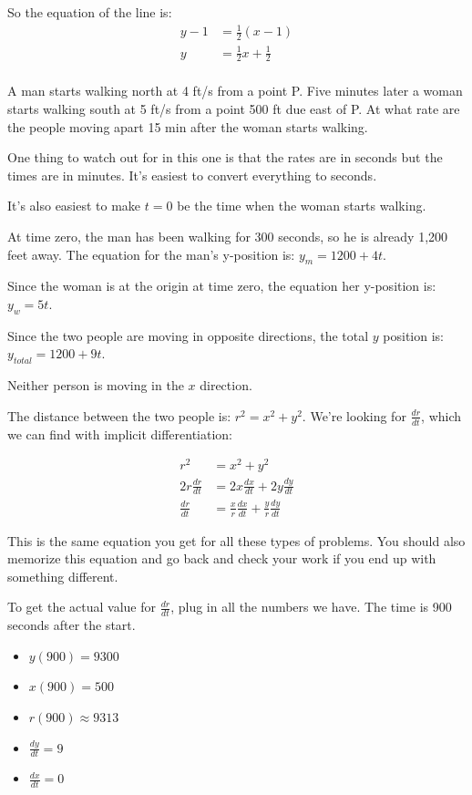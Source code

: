 \documentclass[fleqn,addpoints]{exam}
\begin{document}
\begin{questions}
\begin{solution}
So the equation of the line is: 
\begin{align*}
  y - 1 &= \frac{1}{2}(x - 1) \\
  y &= \frac{1}{2} x + \frac{1}{2} \\
\end{align*}

\end{solution}

\question A man starts walking north at 4 ft/s from a point P. Five minutes later a woman starts walking south at 5 ft/s
from a point 500 ft due east of P. At what rate are the people moving apart 15 min after the woman starts walking.

\begin{solution}
One thing to watch out for in this one is that the rates are in seconds but the times are in minutes.  It's easiest to
convert everything to seconds. 

It's also easiest to make $t = 0$ be the time when the woman starts walking.

At time zero, the man has been walking for 300 seconds, so he is already 1,200 feet away.  The equation
for the man's y-position is: $y_m = 1200 + 4t$.

Since the woman is at the origin at time zero, the equation her y-position is: $y_w = 5t$.

Since the two people are moving in opposite directions, the total $y$ position is: $y_{total} = 1200 + 9t$.

Neither person is moving in the $x$ direction.

The distance between the two people is: $r^2 = x^2 + y^2$.  We're looking for $\frac{dr}{dt}$, which we can find with
implicit differentiation:

\begin{align*}
  r^2 &= x^2 + y^2 \\
  2r \frac{dr}{dt} &= 2x \frac{dx}{dt} + 2y \frac{dy}{dt} \\
  \frac{dr}{dt} &= \frac{x}{r} \frac{dx}{dt} + \frac{y}{r} \frac{dy}{dt}
\end{align*}

This is the same equation you get for all these types of problems.  You should also memorize this equation and go back and check your work
if you end up with something different.

To get the actual value for $\frac{dr}{dt}$, plug in all the numbers we have.  The time is 900 seconds after the start.
\begin{itemize}
  \item $y(900) = 9300$
  \item $x(900) = 500$
  \item $r(900) \approx 9313$
  \item $\frac{dy}{dt} = 9$
  \item $\frac{dx}{dt} = 0$
\end{itemize}


\end{solution}
\end{questions}
\end{document}

